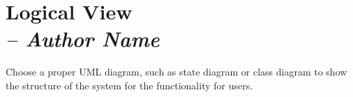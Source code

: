 \chapter{Logical View \\
\small{\textit{-- Author Name}}
\label{Chapter::LogicalView}}

Choose a proper UML diagram, such as state diagram or class diagram to show the structure of
the system for the functionality for users.
